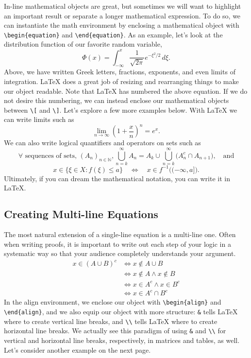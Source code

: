 \documentclass[12pt]{article}	%
\begin{document}
In-line mathematical objects are great, but sometimes we will want to highlight an important result or separate a longer mathematical expression. To do so, we can instantiate the math environment by enclosing a mathematical object with \verb!\begin{equation}! and \verb!\end{equation}!. As an example, let's look at the distribution function of our favorite random variable,
	\begin{equation} \Phi(x) = \int_{-\infty}^x \frac{1}{\sqrt{2 \pi}} e^{-\xi^2/2} \, d\xi. \end{equation}
Above, we have written Greek letters, fractions, exponents, and even limits of integration. \LaTeX{} does a great job of resizing and rearranging things to make our object readable. Note that \LaTeX{} has numbered the above equation. If we do not desire this numbering, we can instead enclose our mathematical objects between \verb!\[! and \verb!\]!. Let's explore a few more examples below. With \LaTeX{} we can write limits such as
	\[ \lim_{n \to \infty}\left(1 + \frac{x}{n} \right)^n = e^x. \]
We can also write logical quantifiers and operators on sets such as
	\[
		\forall \text{ sequences of sets, } (A_n)_{n \in \mathbb{N}},
		\bigcup_{n = k}^\infty A_n
		= A_k \cup \bigcup_{n = k}^\infty \Big( A_n^c \cap A_{n + 1} \Big), \quad \text{and}
	\]
	\[
		x \in \Big\{ \xi \in X : f(\xi) \leq a \Big\}
		\quad \iff \quad
		x \in f^{-1}\Big((-\infty, a]\Big).
	\]
Ultimately, if you can dream the mathematical notation, you can write it in \LaTeX{}.

\subsection{Creating Multi-line Equations}

The most natural extension of a single-line equation is a multi-line one. Often when writing proofs, it is important to write out each step of your logic in a systematic way so that your audience completely understands your argument.
	\begin{align}
		x \in (A \cup B)^c
		&\iff x \not\in A \cup B \\
		&\iff x \not\in A \land x \not\in B \\
		&\iff x \in A^c \land x \in B^c \\
		&\iff x \in A^c \cap B^c
	\end{align}
In the align environment, we enclose our object with \verb!\begin{align}! and \verb!\end{align}!, and we also equip our object with more structure: \verb!&! tells \LaTeX{} where to create vertical line breaks, and \verb!\\! tells \LaTeX{} where to create horizontal line breaks. We actually see this paradigm of using \verb!&! and \verb!\\! for vertical and horizontal line breaks, respectively, in matrices and tables, as well. Let's consider another example on the next page.
\end{document}
